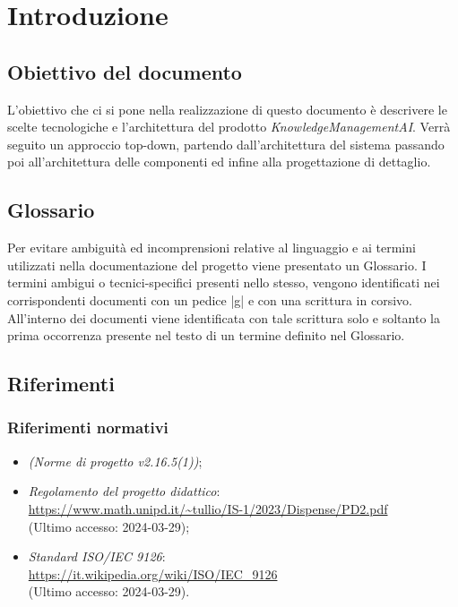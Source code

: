 \documentclass[10pt, a4paper]{article}
\title{\titolo}
\author{SWEetCode}
\begin{document}



\newpage

\tableofcontents
\newpage
\listoffigures
\newpage
\listoftables
\newpage

\section{Introduzione}
\subsection{Obiettivo del documento}
L'obiettivo che ci si pone nella realizzazione di questo documento è descrivere le scelte tecnologiche e l'architettura del prodotto \textit{Knowledge\pg Management\pg AI}. Verrà seguito un approccio top-down, partendo dall'architettura del sistema passando poi all'architettura delle componenti ed infine alla progettazione di dettaglio.

\subsection{Glossario}
Per evitare ambiguità ed incomprensioni relative al linguaggio e ai termini utilizzati nella documentazione del progetto viene presentato un Glossario.
I termini ambigui o tecnici-specifici presenti nello stesso, vengono identificati nei corrispondenti documenti con un pedice |g| e con una scrittura in corsivo.
All'interno dei documenti viene identificata con tale scrittura solo e soltanto la prima occorrenza presente nel testo di un termine definito nel Glossario.

\subsection{Riferimenti}
   \subsubsection{Riferimenti normativi}
   \begin{itemize}
    \item \textit{(Norme di progetto v2.16.5(1))};
    \item \textit{Regolamento del progetto didattico}: \\
        \url{https://www.math.unipd.it/~tullio/IS-1/2023/Dispense/PD2.pdf}\\
        (Ultimo accesso: 2024-03-29);
    \item \textit{Standard ISO/IEC 9126}:\\
        \url{https://it.wikipedia.org/wiki/ISO/IEC_9126}\\
        (Ultimo accesso: 2024-03-29).
    \end{itemize}
    
\end{document}
